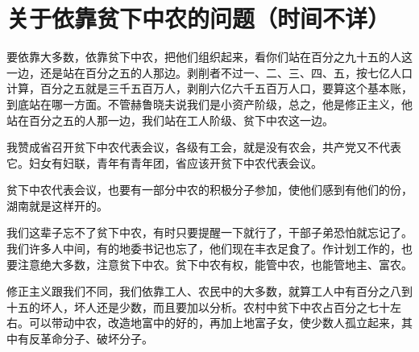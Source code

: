 \section[关于依靠贫下中农的问题（时间不详）]{关于依靠贫下中农的问题（时间不详）}


要依靠大多数，依靠贫下中农，把他们组织起来，看你们站在百分之九十五的人这一边，还是站在百分之五的人那边。剥削者不过一、二、三、四、五，按七亿人口计算，百分之五就是三千五百万人，剥削六亿六千五百万人口，要算这个基本账，到底站在哪一方面。不管赫鲁晓夫说我们是小资产阶级，总之，他是修正主义，他站在百分之五的人那一边，我们站在工人阶级、贫下中农这一边。

我赞成省召开贫下中农代表会议，各级有工会，就是没有农会，共产党又不代表它。妇女有妇联，青年有青年团，省应该开贫下中农代表会议。

贫下中农代表会议，也要有一部分中农的积极分子参加，使他们感到有他们的份，湖南就是这样开的。

我们这辈子忘不了贫下中农，有时只要提醒一下就行了，干部子弟恐怕就忘记了。我们许多人中间，有的地委书记也忘了，他们现在丰衣足食了。作计划工作的，也要注意绝大多数，注意贫下中农。贫下中农有权，能管中农，也能管地主、富农。

修正主义跟我们不同，我们依靠工人、农民中的大多数，就算工人中有百分之八到十五的坏人，坏人还是少数，而且要加以分析。农村中贫下中农占百分之七十左右。可以带动中农，改造地富中的好的，再加上地富子女，使少数人孤立起来，其中有反革命分子、破坏分子。

